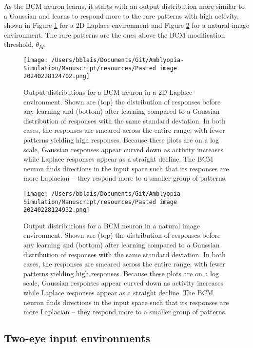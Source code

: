 \documentclass[
]{article}
\begin{document}
As the BCM neuron learns, it starts with an output distribution more
similar to a Gaussian and learns to respond more to the rare patterns
with high activity, shown in Figure \ref{fig:2D_BCM_Laplace} for a 2D
Laplace environment and Figure \ref{fig:BCM_Natural_Image} for a natural
image environment. The rare patterns are the ones above the BCM
modification threshold, \(\theta_M\).

\begin{figure}
\centering
\texttt{[image: /Users/bblais/Documents/Git/Amblyopia-Simulation/Manuscript/resources/Pasted image 20240228124702.png]}
\caption{Output distributions for a BCM neuron in a 2D Laplace
environment. Shown are (top) the distribution of responses before any
learning and (bottom) after learning compared to a Gaussian distribution
of responses with the same standard deviation. In both cases, the
responses are smeared across the entire range, with fewer patterns
yielding high responses. Because these plots are on a log scale,
Gaussian responses appear curved down as activity increases while
Laplace responses appear as a straight decline. The BCM neuron finds
directions in the input space such that its responses are more Laplacian
-- they respond more to a smaller group of
patterns.}\label{fig:2D_BCM_Laplace}
\end{figure}

\begin{figure}
\centering
\texttt{[image: /Users/bblais/Documents/Git/Amblyopia-Simulation/Manuscript/resources/Pasted image 20240228124932.png]}
\caption{Output distributions for a BCM neuron in a natural image
environment. Shown are (top) the distribution of responses before any
learning and (bottom) after learning compared to a Gaussian distribution
of responses with the same standard deviation. In both cases, the
responses are smeared across the entire range, with fewer patterns
yielding high responses. Because these plots are on a log scale,
Gaussian responses appear curved down as activity increases while
Laplace responses appear as a straight decline. The BCM neuron finds
directions in the input space such that its responses are more Laplacian
-- they respond more to a smaller group of
patterns.}\label{fig:BCM_Natural_Image}
\end{figure}

\subsection{Two-eye input
environments}\label{sec:two-eye-input-environments}
\end{document}
